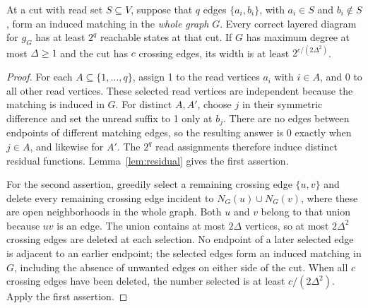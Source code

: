 \begin{lemma}
\label{lem:crossing-matching}
At a cut with read set \(S\subseteq V\), suppose that \(q\) edges
\(\{a_i,b_i\}\), with \(a_i\in S\) and \(b_i\notin S\), form an
induced matching in the \emph{whole graph} \(G\). Every correct layered
diagram for \(g_G\) has at least \(2^q\) reachable states at that cut.
If \(G\) has maximum degree at most \(\Delta\geq1\) and the cut has
\(c\) crossing edges, its width is at least
\(2^{c/(2\Delta^2)}\).
\end{lemma}
\begin{proof}
For each \(A\subseteq\{1,\ldots,q\}\), assign 1 to the read vertices
\(a_i\) with \(i\in A\), and 0 to all other read vertices.
These selected read vertices are independent because the matching is induced
in \(G\). For distinct \(A,A'\), choose \(j\) in their symmetric
difference and set the unread suffix to 1 only at \(b_j\).
There are no edges between endpoints of different matching edges, so the
resulting answer is 0 exactly when \(j\in A\), and likewise for \(A'\).
The \(2^q\) read assignments therefore induce distinct residual functions.
Lemma~\ref{lem:residual} gives the first assertion.

For the second assertion, greedily select a remaining crossing edge
\(\{u,v\}\) and delete every remaining crossing edge incident to
\(N_G(u)\cup N_G(v)\), where these are open neighborhoods in the whole
graph. Both \(u\) and \(v\) belong to that union because \(uv\) is an
edge. The union contains at most \(2\Delta\) vertices, so at most
\(2\Delta^2\) crossing edges are deleted at each selection.
No endpoint of a later selected edge is adjacent to an earlier endpoint;
the selected edges form an induced matching in \(G\), including the absence
of unwanted edges on either side of the cut. When all \(c\) crossing edges
have been deleted, the number selected is at least \(c/(2\Delta^2)\).
Apply the first assertion.
\end{proof}

